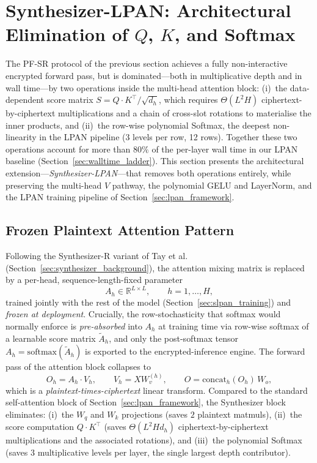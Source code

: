 \section{Synthesizer-LPAN: Architectural Elimination of $Q$, $K$, and Softmax}
\label{sec:synthesizer_lpan}

The PF-SR protocol of the previous section achieves a fully non-interactive encrypted forward pass, but is dominated---both in multiplicative depth and in wall time---by two operations inside the multi-head attention block: (i)~the data-dependent score matrix $S = Q\!\cdot\!K^\top / \sqrt{d_h}$, which requires $\Theta(L^2 H)$ ciphertext-by-ciphertext multiplications and a chain of cross-slot rotations to materialise the inner products, and (ii)~the row-wise polynomial Softmax, the deepest non-linearity in the LPAN pipeline (3 levels per row, 12 rows). Together these two operations account for more than $80\%$ of the per-layer wall time in our LPAN baseline (Section~\ref{sec:walltime_ladder}). This section presents the architectural extension---\emph{Synthesizer-LPAN}---that removes both operations entirely, while preserving the multi-head $V$ pathway, the polynomial GELU and LayerNorm, and the LPAN training pipeline of Section~\ref{sec:lpan_framework}.

\subsection{Frozen Plaintext Attention Pattern}
\label{sec:synth_pattern}

Following the Synthesizer-R variant of Tay et al.~\cite{tay2020synthesizer} (Section~\ref{sec:synthesizer_background}), the attention mixing matrix is replaced by a per-head, sequence-length-fixed parameter
\begin{equation}
A_h \in \mathbb{R}^{L\times L}, \qquad h = 1, \ldots, H,
\label{eq:synth_pattern}
\end{equation}
trained jointly with the rest of the model (Section~\ref{sec:slpan_training}) and \emph{frozen at deployment}. Crucially, the row-stochasticity that softmax would normally enforce is \emph{pre-absorbed} into $A_h$ at training time via row-wise softmax of a learnable score matrix $\tilde A_h$, and only the post-softmax tensor $A_h = \mathrm{softmax}(\tilde A_h)$ is exported to the encrypted-inference engine. The forward pass of the attention block collapses to
\begin{equation}
O_h = A_h \cdot V_h, \qquad V_h = X W_v^{(h)}, \qquad O = \mathrm{concat}_h(O_h)\, W_o,
\label{eq:synth_forward}
\end{equation}
which is a \emph{plaintext-times-ciphertext} linear transform. Compared to the standard self-attention block of Section~\ref{sec:lpan_framework}, the Synthesizer block eliminates: (i)~the $W_q$ and $W_k$ projections (saves $2$ plaintext matmuls), (ii)~the score computation $Q\!\cdot\!K^\top$ (saves $\Theta(L^2 H d_h)$ ciphertext-by-ciphertext multiplications and the associated rotations), and (iii)~the polynomial Softmax (saves $3$ multiplicative levels per layer, the single largest depth contributor).

